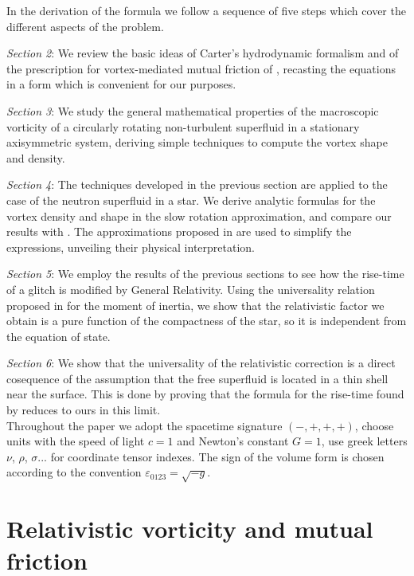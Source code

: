 \documentclass[usenatbib%
]{mnras}
\begin{document}
In the derivation of the formula we follow a sequence of five steps which cover the different aspects of the problem.   

\textit{Section 2}: We review the basic ideas of Carter's hydrodynamic  formalism and of the prescription for vortex-mediated mutual friction of \cite{langlois98}, recasting the equations in a form which is convenient for our purposes.

\textit{Section 3}: We study the general mathematical properties of the macroscopic vorticity of a circularly rotating non-turbulent superfluid in a stationary axisymmetric system, deriving simple techniques to compute the vortex shape and density.

\textit{Section 4}: The techniques developed in the previous section are applied to the case of the neutron superfluid in a star. We derive analytic formulas for the vortex density and shape in the slow rotation approximation, and compare our results with \cite{Rothen1981}. The approximations proposed in \cite{Ravenhall_Pethick1994} are used to simplify the expressions, unveiling their physical interpretation.

\textit{Section 5}: We employ the results of the previous sections to see how the rise-time of a glitch is modified by General Relativity. Using the universality relation proposed in \cite{Rezzolla_Universal_2016} for the moment of inertia, we show that the relativistic factor we obtain is a pure function of the compactness of the star, so it is independent from the equation of state.


\textit{Section 6}: We show that the universality of the relativistic correction is a direct cosequence of the assumption that the free superfluid is located in a thin shell near the surface. This is done by proving that the formula for the rise-time found by \cite{sourie_glitch2017} reduces to ours in this limit.\\


Throughout the paper we adopt the spacetime signature $ ( - , +, + , + ) $, choose units with the speed of light $c=1$ and Newton's constant $G=1$, use greek letters $\nu$, $\rho$, $\sigma$... for coordinate tensor indexes. The sign of the volume form is chosen according to the convention $\varepsilon_{0123} = \sqrt{-g}$.




\section{Relativistic vorticity and mutual friction}\label{STS}
\end{document}
